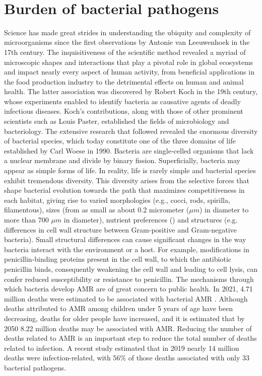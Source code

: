 \renewcommand*{\thefootnote}{\arabic{footnote}}

\mbox{}\\
\vspace{8cm}

\section{Burden of bacterial pathogens}

Science has made great strides in understanding the ubiquity and complexity of microorganisms since the first observations by Antonie van Leeuwenhoek in the 17th century. The inquisitiveness of the scientific method revealed a myriad of microscopic shapes and interactions that play a pivotal role in global ecosystems and impact nearly every aspect of human activity, from beneficial applications in the food production industry to the detrimental effects on human and animal health. The latter association was discovered by Robert Koch in the 19th century, whose experiments enabled to identify bacteria as causative agents of deadly infectious diseases. Koch’s contributions, along with those of other prominent scientists such as Louis Paster, established the fields of microbiology and bacteriology. The extensive research that followed revealed the enormous diversity of bacterial species, which today constitute one of the three domains of life established by Carl Woese in 1990.
Bacteria are single-celled organisms that lack a nuclear membrane and divide by binary fission. Superficially, bacteria may appear as simple forms of life. In reality, life is rarely simple and bacterial species exhibit tremendous diversity. This diversity arises from the selective forces that shape bacterial evolution towards the path that maximizes competitiveness in each habitat, giving rise to varied morphologies (e.g., cocci, rods, spirilla, filamentous), sizes (from as small as about 0.2 micrometer ($\mu m$) in diameter to more than 700 $\mu m$ in diameter), nutrient preferences () and structures (e.g. differences in cell wall structure between Gram-positive and Gram-negative bacteria).
Small structural differences can cause significant changes in the way bacteria interact with the environment or a host. For example, modifications in penicillin-binding proteins present in the cell wall, to which the antibiotic penicillin binds, consequently weakening the cell wall and leading to cell lysis, can confer reduced susceptibility or resistance to penicillin. The mechanisms through which bacteria develop \ac{AMR} are of great concern to public health. In 2021, 4.71 million deaths were estimated to be associated with bacterial \ac{AMR} \cite{naghavi_global_2024}. Although deaths attributed to \ac{AMR} among children under 5 years of age have been decreasing, deaths for older people have increased, and it is estimated that by 2050 8.22 million deaths may be associated with \ac{AMR}. Reducing the number of deaths related to \ac{AMR} is an important step to reduce the total number of deaths related to infection. A recent study estimated that in 2019 nearly 14 million deaths were infection-related, with 56\% of those deaths associated with only 33 bacterial pathogens.

